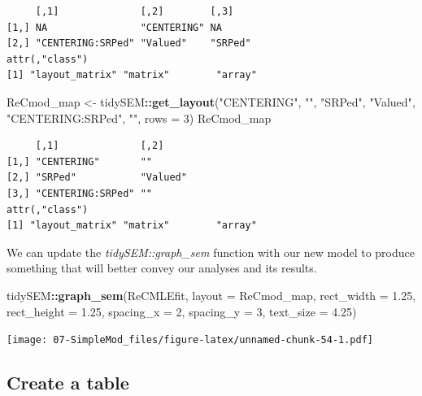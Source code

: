 \documentclass[
  11pt,
]{book}
\newenvironment{Shaded}{\begin{snugshade}}{\end{snugshade}}
\newcommand{\AttributeTok}[1]{\textcolor[rgb]{0.27,0.27,0.27}{#1}}
\newcommand{\DecValTok}[1]{\textcolor[rgb]{0.06,0.06,0.06}{#1}}
\newcommand{\FloatTok}[1]{\textcolor[rgb]{0.06,0.06,0.06}{#1}}
\newcommand{\FunctionTok}[1]{\textcolor[rgb]{0.27,0.27,0.27}{\textbf{#1}}}
\newcommand{\NormalTok}[1]{#1}
\newcommand{\OtherTok}[1]{\textcolor[rgb]{0.37,0.37,0.37}{#1}}
\newcommand{\SpecialCharTok}[1]{\textcolor[rgb]{0.43,0.43,0.43}{\textbf{#1}}}
\newcommand{\StringTok}[1]{\textcolor[rgb]{0.5,0.5,0.5}{#1}}
\begin{document}
\begin{verbatim}
     [,1]              [,2]        [,3]   
[1,] NA                "CENTERING" NA     
[2,] "CENTERING:SRPed" "Valued"    "SRPed"
attr(,"class")
[1] "layout_matrix" "matrix"        "array"        
\end{verbatim}

\begin{Shaded}
\begin{Highlighting}[]
\NormalTok{ReCmod\_map }\OtherTok{\textless{}{-}}\NormalTok{ tidySEM}\SpecialCharTok{::}\FunctionTok{get\_layout}\NormalTok{(}\StringTok{"CENTERING"}\NormalTok{, }\StringTok{""}\NormalTok{, }\StringTok{"SRPed"}\NormalTok{, }\StringTok{"Valued"}\NormalTok{, }\StringTok{"CENTERING:SRPed"}\NormalTok{,}
    \StringTok{""}\NormalTok{, }\AttributeTok{rows =} \DecValTok{3}\NormalTok{)}
\NormalTok{ReCmod\_map}
\end{Highlighting}
\end{Shaded}

\begin{verbatim}
     [,1]              [,2]    
[1,] "CENTERING"       ""      
[2,] "SRPed"           "Valued"
[3,] "CENTERING:SRPed" ""      
attr(,"class")
[1] "layout_matrix" "matrix"        "array"        
\end{verbatim}

We can update the \emph{tidySEM::graph\_sem} function with our new model to produce something that will better convey our analyses and its results.

\begin{Shaded}
\begin{Highlighting}[]
\NormalTok{tidySEM}\SpecialCharTok{::}\FunctionTok{graph\_sem}\NormalTok{(ReCMLEfit, }\AttributeTok{layout =}\NormalTok{ ReCmod\_map, }\AttributeTok{rect\_width =} \FloatTok{1.25}\NormalTok{, }\AttributeTok{rect\_height =} \FloatTok{1.25}\NormalTok{,}
    \AttributeTok{spacing\_x =} \DecValTok{2}\NormalTok{, }\AttributeTok{spacing\_y =} \DecValTok{3}\NormalTok{, }\AttributeTok{text\_size =} \FloatTok{4.25}\NormalTok{)}
\end{Highlighting}
\end{Shaded}

\texttt{[image: 07-SimpleMod\_files/figure-latex/unnamed-chunk-54-1.pdf]}

\hypertarget{create-a-table}{%
\subsection*{Create a table}\label{create-a-table}}
\end{document}
